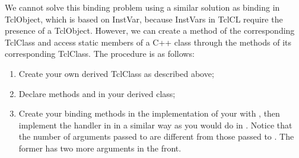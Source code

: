 We cannot solve this binding problem using a similar solution as
binding in TclObject, which is based on InstVar, because InstVars in
TclCL require the presence of a TclObject.
However, we can create a method of the corresponding TclClass and
access static members of a C++ class through the methods of its
corresponding TclClass.
The procedure is as follows:
\begin{enumerate}
\item Create your own derived TclClass as described above;
\item Declare methods  and  in your derived
  class;
\item Create your binding methods in the implementation of your
   with , then implement
  the handler in  in a similar way as you would do in
  . 
  Notice that the number of arguments passed to
   are different from those passed to
  .
  The former has two more arguments in the front. 
\end{enumerate}

